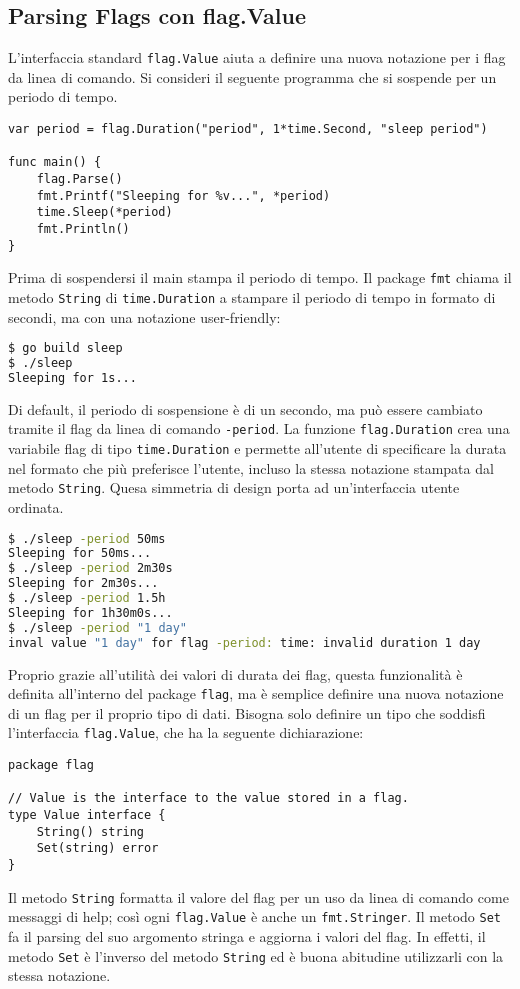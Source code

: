 \documentclass[../../thesis.tex]{subfiles}
\begin{document}
    \subsection{Parsing Flags con flag.Value}\label{subsec:parsing-flags-con-flag.value}
    L'interfaccia standard \verb"flag.Value" aiuta a definire una nuova notazione per i flag da linea di comando.
    Si consideri il seguente programma che si sospende per un periodo di tempo.
    \begin{lstlisting}[frame = single, label = {lst:lstlisting6-4.1}]
var period = flag.Duration("period", 1*time.Second, "sleep period")

func main() {
    flag.Parse()
    fmt.Printf("Sleeping for %v...", *period)
    time.Sleep(*period)
    fmt.Println()
}
    \end{lstlisting}
    Prima di sospendersi il main stampa il periodo di tempo.
    Il package \verb"fmt" chiama il metodo \verb"String" di \verb"time.Duration" a stampare il periodo di tempo in formato di secondi, ma con una notazione user-friendly:
    \begin{lstlisting}[language = bash, frame = L, label = {lst:lstlisting6-4.2}]
$ go build sleep
$ ./sleep
Sleeping for 1s...
    \end{lstlisting}
    Di default, il periodo di sospensione è di un secondo, ma può essere cambiato tramite il flag da linea di comando \verb"-period".
    La funzione \verb"flag.Duration" crea una variabile flag di tipo \verb"time.Duration" e permette all'utente di specificare la durata nel formato che più preferisce l'utente, incluso la stessa notazione stampata dal metodo \verb"String".
    Quesa simmetria di design porta ad un'interfaccia utente ordinata.
    \begin{lstlisting}[language = bash, frame = L, label = {lst:lstlisting6-4.3}]
$ ./sleep -period 50ms
Sleeping for 50ms...
$ ./sleep -period 2m30s
Sleeping for 2m30s...
$ ./sleep -period 1.5h
Sleeping for 1h30m0s...
$ ./sleep -period "1 day"
inval value "1 day" for flag -period: time: invalid duration 1 day
    \end{lstlisting}
    Proprio grazie all'utilità dei valori di durata dei flag, questa funzionalità è definita all'interno del package \verb"flag", ma è semplice definire una nuova notazione di un flag per il proprio tipo di dati.
    Bisogna solo definire un tipo che soddisfi l'interfaccia \verb"flag.Value", che ha la seguente dichiarazione:
    \begin{lstlisting}[frame = single, label = {lst:lstlisting6-4.4}]
package flag

// Value is the interface to the value stored in a flag.
type Value interface {
    String() string
    Set(string) error
}
    \end{lstlisting}
    Il metodo \verb"String" formatta il valore del flag per un uso da linea di comando come messaggi di help;
    così ogni \verb"flag.Value" è anche un \verb"fmt.Stringer".
    Il metodo \verb"Set" fa il parsing del suo argomento stringa e aggiorna i valori del flag.
    In effetti, il metodo \verb"Set" è l'inverso del metodo \verb"String" ed è buona abitudine utilizzarli con la stessa notazione.
    \hfill \vspace{12pt}
\end{document}
